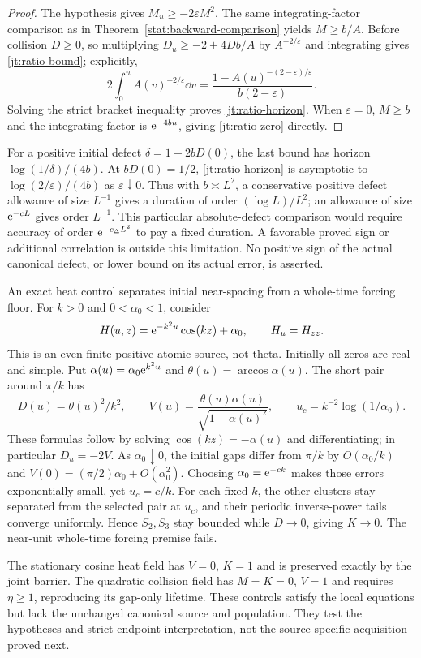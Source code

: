 \begin{proof}
The hypothesis gives $M_u\ge-2\varepsilon M^2$. The same
integrating-factor comparison as in
Theorem~\ref{stat:backward-comparison} yields $M\ge b/A$.
Before collision $D\ge0$, so multiplying
$D_u\ge-2+4Db/A$ by $A^{-2/\varepsilon}$ and integrating gives
\eqref{jt:ratio-bound}; explicitly,
\[
 2\int_0^u A(v)^{-2/\varepsilon}\dd v
 =\frac{1-A(u)^{-(2-\varepsilon)/\varepsilon}}
       {b(2-\varepsilon)}.
\]
Solving the strict bracket inequality proves
\eqref{jt:ratio-horizon}. When $\varepsilon=0$, $M\ge b$ and
the integrating factor is $\mathrm e^{-4bu}$, giving
\eqref{jt:ratio-zero} directly.
\end{proof}

For a positive initial defect $\delta=1-2bD(0)$, the last bound has
horizon $\log(1/\delta)/(4b)$. At $bD(0)=1/2$,
\eqref{jt:ratio-horizon} is asymptotic to
$\log(2/\varepsilon)/(4b)$ as $\varepsilon\downarrow0$.
Thus with $b\asymp L^2$, a conservative positive defect allowance of
size $L^{-1}$ gives a duration of order $(\log L)/L^2$; an allowance
of size $\mathrm e^{-cL}$ gives order $L^{-1}$. This particular absolute-defect
comparison would require accuracy of order $\mathrm e^{-c_\Delta L^2}$
to pay a fixed duration. A favorable proved sign or additional
correlation is outside this limitation. No positive sign of the actual
canonical defect, or lower bound on its actual error, is asserted.

An exact heat control separates initial near-spacing from a whole-time
forcing floor. For $k>0$ and $0<\alpha_0<1$, consider
\begin{equation}
 H(u,z)=\mathrm e^{-k^2u}\cos(kz)+\alpha_0,
 \qquad H_u=H_{zz}.
 \label{jt:cosine-control}
\end{equation}
This is an even finite positive atomic source, not theta. Initially all
zeros are real and simple. Put $\alpha(u)=\alpha_0\mathrm e^{k^2u}$ and
$\theta(u)=\arccos\alpha(u)$. The short pair around $\pi/k$ has
\[
 D(u)=\theta(u)^2/k^2,\qquad
 V(u)=\frac{\theta(u)\alpha(u)}{\sqrt{1-\alpha(u)^2}},
 \qquad u_c=k^{-2}\log(1/\alpha_0).
\]
These formulas follow by solving $\cos(kz)=-\alpha(u)$ and
differentiating; in particular $D_u=-2V$. As $\alpha_0\downarrow0$,
the initial gaps differ from $\pi/k$ by $O(\alpha_0/k)$ and
$V(0)=(\pi/2)\alpha_0+O(\alpha_0^2)$. Choosing
$\alpha_0=\mathrm e^{-ck}$ makes those errors exponentially small, yet
$u_c=c/k$. For each fixed $k$, the other clusters stay separated from
the selected pair at $u_c$, and their periodic inverse-power tails
converge uniformly. Hence $S_2,S_3$ stay bounded while $D\to0$, giving
$K\to0$. The near-unit whole-time forcing premise fails.

The stationary cosine heat field has $V=0$, $K=1$ and is preserved
exactly by the joint barrier. The quadratic collision field has
$M=K=0$, $V=1$ and requires $\eta\ge1$, reproducing its gap-only
lifetime. These controls satisfy the local equations but lack the
unchanged canonical source and population. They test the hypotheses
and strict endpoint interpretation, not the source-specific acquisition
proved next.
